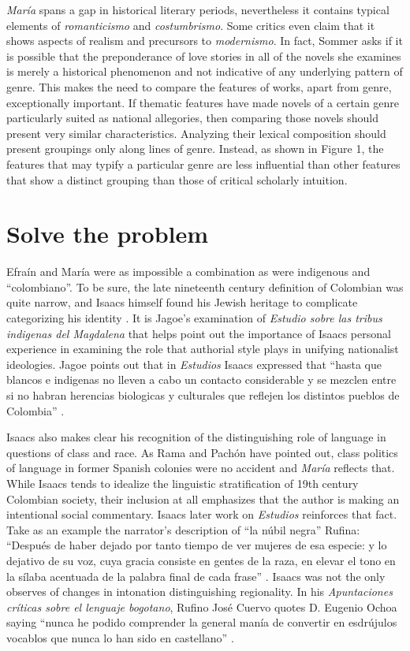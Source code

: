 \documentclass[12pt]{report}
\begin{document}
\textit{María} spans a gap in historical literary periods, nevertheless it contains typical elements of \textit{romanticismo} and \textit{costumbrismo}.
Some critics even claim that it shows aspects of realism and precursors to \textit{modernismo}.
In fact, Sommer asks if it is possible that the preponderance of love stories in all of the novels she examines is merely a historical phenomenon and not indicative of any underlying pattern of genre.
This makes the need to compare the features of works, apart from genre, exceptionally important.
If thematic features have made novels of a certain genre particularly suited as national allegories, then comparing those novels should present very similar characteristics.
Analyzing their lexical composition should present groupings only along lines of genre.
Instead, as shown in Figure 1, the features that may typify a particular genre are less influential than other features that show a distinct grouping than those of critical scholarly intuition.


\section{Solve the problem}

Efraín and María were as impossible a combination as were indigenous and \enquote{colombiano}.
To be sure, the late nineteenth century definition of Colombian was quite narrow, and Isaacs himself found his Jewish heritage to complicate categorizing his identity \autocite[160]{Jagoe2003}.
It is Jagoe's examination of \textit{Estudio sobre las tribus indigenas del Magdalena} that helps point out the importance of Isaacs personal experience in examining the role that authorial style plays in unifying nationalist ideologies. 
Jagoe points out that in \textit{Estudios} Isaacs expressed that \enquote{hasta que blancos e indigenas no lleven a cabo un contacto considerable y se mezclen entre si no habran herencias biologicas y culturales que reflejen los distintos pueblos de Colombia} \autocite[160]{Jagoe2003}.


Isaacs also makes clear his recognition of the distinguishing role of language in questions of class and race.
As Rama and Pachón have pointed out, class politics of language in former Spanish colonies were no accident and \textit{María} reflects that.
While Isaacs tends to idealize the linguistic stratification of 19th century Colombian society, their inclusion at all emphasizes that the author is making an intentional social commentary.
Isaacs later work on \textit{Estudios} reinforces that fact.
Take as an example the narrator's description of \enquote{la núbil negra} Rufina:
\enquote{Después de haber dejado por tanto tiempo de ver mujeres de esa especie: y lo dejativo de su voz, cuya gracia consiste en gentes de la raza, en elevar el tono en la sílaba acentuada de la palabra final de cada frase} \autocite[304]{Isaacs2012}.
Isaacs was not the only observes of changes in intonation distinguishing regionality.
In his \textit{Apuntaciones críticas sobre el lenguaje bogotano}, Rufino José Cuervo quotes D. Eugenio Ochoa saying \enquote{nunca he podido comprender la general manía de convertir en esdrújulos vocablos que nunca lo han sido en castellano} \autocite[3]{Cuervo1876}.
\end{document}
